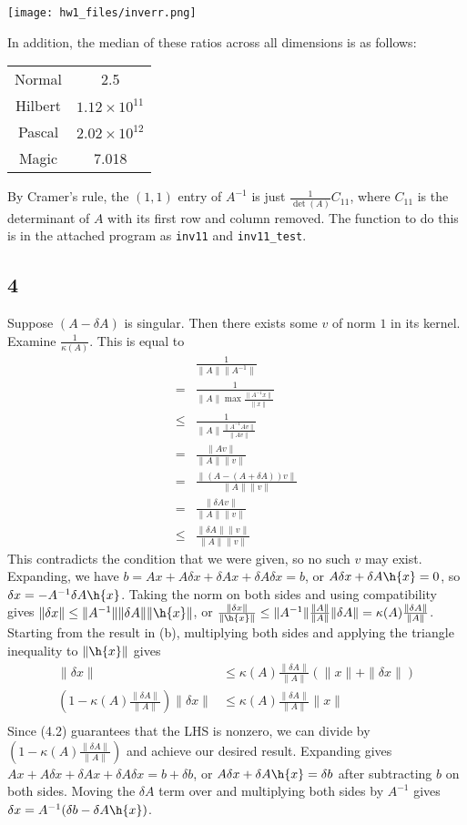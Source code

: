 \documentclass{article}
\begin{document}
\texttt{[image: hw1\_files/inverr.png]}

In addition, the median of these ratios across all dimensions is as follows:

\begin{tabular}{c|c}
    Normal&2.5\\
    Hilbert&$1.12\times10^{11}$\\
    Pascal&$2.02\times10^{12}$\\
    Magic&7.018\\
\end{tabular}

By Cramer's rule, the $(1,1)$ entry of $A^{-1}$ is just $\frac{1}{\det(A)}C_{11}$, where $C_{11}$ is the determinant of $A$ with its first row and column removed. The function to do this is in the attached program as \verb|inv11| and \verb|inv11_test|.

\subsection*{4}
Suppose $(A-\delta A)$ is singular. Then there exists some $v$ of norm $1$ in its kernel. Examine $\frac{1}{\kappa(A)}$. This is equal to
\begin{align*}
    &\frac{1}{\|A\|\|A^{-1}\|}\\
    =&\frac{1}{\|A\|\max\frac{\|A^{-1}x\|}{\|x\|}}\\
    \leq&\frac{1}{\|A\|\frac{\|A^{-1}Av\|}{\|Av\|}}\\
    =&\frac{\|Av\|}{\|A\|\|v\|}\\
    =&\frac{\|(A-(A+\delta A))v\|}{\|A\|\|v\|}\\
    =&\frac{\|\delta Av\|}{\|A\|\|v\|}\\
    \leq&\frac{\|\delta A\|\|v\|}{\|A\|\|v\|}
\end{align*}
This contradicts the condition that we were given, so no such $v$ may exist.
Expanding, we have $b=Ax+A\delta x+\delta Ax + \delta A\delta x=b$, or $A\delta x+\delta A\h{x}=0$, so $\delta x=-A^{-1}\delta A\h{x}$. Taking the norm on both sides and using compatibility gives $\|\delta x\|\leq\|A^{-1}\|\|\delta A\|\|\h{x}\|$, or $\frac{\|\delta x\|}{\|\h{x}\|}\leq\|A^{-1}\|\frac{\|A\|}{\|A\|}\|\delta A\|=\kappa(A)\frac{\|\delta A\|}{\|A\|}$.
Starting from the result in (b), multiplying both sides and applying the triangle inequality to $\|\h{x}\|$ gives 
\begin{align*}
    \|\delta x\|&\leq\kappa(A)\frac{\|\delta A\|}{\|A\|}(\|x\|+\|\delta x\|)\\
    \left(1-\kappa(A)\frac{\|\delta A\|}{\|A\|}\right)\|\delta x\|&\leq\kappa(A)\frac{\|\delta A\|}{\|A\|}\|x\|\\
\end{align*}
Since (4.2) guarantees that the LHS is nonzero, we can divide by $\left(1-\kappa(A)\frac{\|\delta A\|}{\|A\|}\right)$ and achieve our desired result.
Expanding gives $Ax+A\delta x+\delta Ax+\delta A\delta x = b+\delta b$, or $A\delta x+\delta A\h{x}=\delta b$ after subtracting $b$ on both sides. Moving the $\delta A$ term over and multiplying both sides by $A^{-1}$ gives $\delta x=A^{-1}(\delta b-\delta A\h{x})$.
\end{document}
